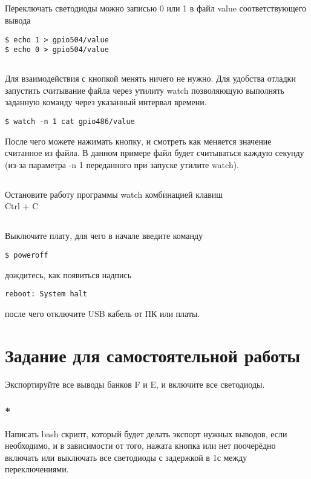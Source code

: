 \subsection{}Переключать светодиоды можно записью 0 или 1 в файл value соответствующего вывода
\begin{lstlisting}[style=bash]
$ echo 1 > gpio504/value
$ echo 0 > gpio504/value
\end{lstlisting}

\subsection{}Для взаимодействия с кнопкой менять ничего не нужно. Для удобства отладки запустить считывание файла через утилиту watch позволяющую выполнять заданную команду через указанный интервал времени.

\begin{lstlisting}[style=bash]
$ watch -n 1 cat gpio486/value
\end{lstlisting}

После чего можете нажимать кнопку, и смотреть как меняется значение считанное из файла. В данном примере файл будет считываться каждую секунду (из-за параметра -n 1 переданного при запуске утилите watch).  

\subsection{}Остановите работу программы watch комбинацией клавиш \\ Ctrl + C

\subsection{} Выключите плату, для чего в начале введите команду
\begin{lstlisting}[style=bash]
	$ poweroff
\end{lstlisting}
дождитесь, как появиться надпись
\begin{lstlisting}[style=stdout]
	reboot: System halt
\end{lstlisting}
после чего отключите USB кабель от ПК или платы. 

\section{Задание для самостоятельной работы}
Экспортируйте все выводы банков F и E, и включите все светодиоды.

\subsubsection{*} Написать bash скрипт, который будет делать экспорт нужных выводов, если необходимо, и в зависимости от того, нажата кнопка или нет поочерёдно включать или выключать все светодиоды с задержкой в 1с между переключениями. 
